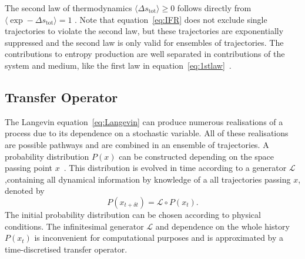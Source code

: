 The second law of thermodynamics $ \langle \Delta s_{\text{tot}} \rangle \geq 0$ follows directly from $\langle \exp - \Delta s_{\text{tot}} \rangle =1 $ . Note that equation~\ref{eq:IFR} does not exclude single trajectories to violate the second law, but these trajectories are exponentially suppressed and the second law is only valid for ensembles of trajectories.   The contributions to entropy production are well separated in contributions of the system and medium, like the first law in equation~\ref{eq:1stlaw}~\cite{seifert2008stochastic}.


\subsection{Transfer Operator}
\label{sec:transferoperator}
The Langevin equation~\ref{eq:Langevin} can produce numerous realisations of a process due to its dependence on a stochastic variable. All of these realisations are possible pathways and are combined in an ensemble of trajectories. A probability distribution $P(x)$ can be constructed depending on the space passing point $x$~\cite{bowman2013introduction}. This distribution is evolved in time according to a generator $\mathscr{L}$,containing all dynamical information by knowledge of a all trajectories passing $x$, denoted by
\begin{equation}
 P(x_{t+\delta t}) = \mathscr{L} \circ  P(x_t).
 \label{eq:operatorcts}
\end{equation} %
The initial probability distribution can be chosen according to physical 
conditions. The infinitesimal generator $\mathscr{L}$ and dependence on the whole history $P(x_t)$ is inconvenient for computational purposes and is approximated by a time-discretised transfer operator.

